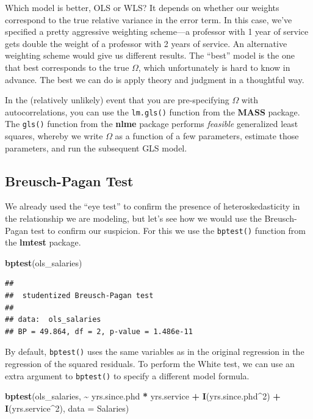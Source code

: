 \documentclass[
  12pt,
  oneside,openany]{book}
\newenvironment{Shaded}{\begin{snugshade}}{\end{snugshade}}
\newcommand{\DataTypeTok}[1]{\textcolor[rgb]{0.13,0.29,0.53}{#1}}
\newcommand{\DecValTok}[1]{\textcolor[rgb]{0.00,0.00,0.81}{#1}}
\newcommand{\KeywordTok}[1]{\textcolor[rgb]{0.13,0.29,0.53}{\textbf{#1}}}
\newcommand{\NormalTok}[1]{#1}
\newcommand{\OperatorTok}[1]{\textcolor[rgb]{0.81,0.36,0.00}{\textbf{#1}}}
\newcommand{\StringTok}[1]{\textcolor[rgb]{0.31,0.60,0.02}{#1}}
\begin{document}
Which model is better, OLS or WLS? It depends on whether our weights correspond to the true relative variance in the error term. In this case, we've specified a pretty aggressive weighting scheme---a professor with 1 year of service gets double the weight of a professor with 2 years of service. An alternative weighting scheme would give us different results. The ``best'' model is the one that best corresponds to the true \(\Omega\), which unfortunately is hard to know in advance. The best we can do is apply theory and judgment in a thoughtful way.

In the (relatively unlikely) event that you are pre-specifying \(\Omega\) with autocorrelations, you can use the \texttt{lm.gls()} function from the \textbf{MASS} package. The \texttt{gls()} function from the \textbf{nlme} package performs \emph{feasible} generalized least squares, whereby we write \(\Omega\) as a function of a few parameters, estimate those parameters, and run the subsequent GLS model.

\hypertarget{breusch-pagan-test}{%
\subsection{Breusch-Pagan Test}\label{breusch-pagan-test}}

We already used the ``eye test'' to confirm the presence of heteroskedasticity in the relationship we are modeling, but let's see how we would use the Breusch-Pagan test to confirm our suspicion. For this we use the \texttt{bptest()} function from the \textbf{lmtest} package.

\begin{Shaded}
\begin{Highlighting}[]
\KeywordTok{bptest}\NormalTok{(ols\_salaries)}
\end{Highlighting}
\end{Shaded}

\begin{verbatim}
## 
##  studentized Breusch-Pagan test
## 
## data:  ols_salaries
## BP = 49.864, df = 2, p-value = 1.486e-11
\end{verbatim}

By default, \texttt{bptest()} uses the same variables as in the original regression in the regression of the squared residuals. To perform the White test, we can use an extra argument to \texttt{bptest()} to specify a different model formula.

\begin{Shaded}
\begin{Highlighting}[]
\KeywordTok{bptest}\NormalTok{(ols\_salaries,}
       \OperatorTok{\textasciitilde{}}\StringTok{ }\NormalTok{yrs.since.phd }\OperatorTok{*}\StringTok{ }\NormalTok{yrs.service }\OperatorTok{+}\StringTok{ }\KeywordTok{I}\NormalTok{(yrs.since.phd}\OperatorTok{\^{}}\DecValTok{2}\NormalTok{) }\OperatorTok{+}\StringTok{ }\KeywordTok{I}\NormalTok{(yrs.service}\OperatorTok{\^{}}\DecValTok{2}\NormalTok{),}
       \DataTypeTok{data =}\NormalTok{ Salaries)}
\end{Highlighting}
\end{Shaded}
\end{document}
